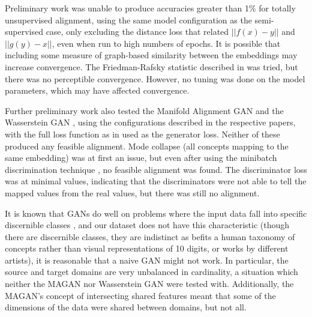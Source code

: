 Preliminary work was unable to produce accuracies greater than 1\% for totally unsupervised alignment, using the same model configuration as the semi-supervised case, only excluding the distance loss that related $||f(x) - y||$ and $||g(y) - x||$, even when run to high numbers of epochs. It is possible that including some measure of graph-based similarity between the embeddings may increase convergence. The Friedman-Rafsky statistic described in \cite{torchtwosample} was tried, but there was no perceptible convergence. However, no tuning was done on the model parameters, which may have affected convergence. 

Further preliminary work also tested the Manifold Alignment GAN \cite{magan} and the Wasserstein GAN \cite{WassersteinGAN}, using the configurations described in the respective papers, with the full loss function as in  used as the generator loss. Neither of these produced any feasible alignment. Mode collapse (all concepts mapping to the same embedding) was at first an issue, but even after using the minibatch discrimination technique , no feasible alignment was found. The discriminator loss was at minimal values, indicating that the discriminators were not able to tell the mapped values from the real values, but there was still no alignment.  

It is known that GANs do well on problems where the input data fall into specific discernible classes , and our dataset does not have this characteristic (though there are discernible classes, they are indistinct as befits a human taxonomy of concepts rather than visual representations of 10 digits, or works by different artists), it is reasonable that a naive GAN might not work. In particular, the source and target domains are very unbalanced in cardinality, a situation which neither the MAGAN nor Wasserstein GAN were tested with. Additionally, the MAGAN's concept of intersecting shared features meant that some of the dimensions of the data were shared between domains, but not all.